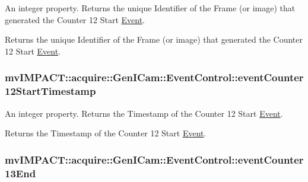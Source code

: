 An integer property. Returns the unique Identifier of the Frame (or image) that generated the Counter 12 Start \hyperlink{classmv_i_m_p_a_c_t_1_1acquire_1_1_event}{Event}. 

Returns the unique Identifier of the Frame (or image) that generated the Counter 12 Start \hyperlink{classmv_i_m_p_a_c_t_1_1acquire_1_1_event}{Event}. \hypertarget{classmv_i_m_p_a_c_t_1_1acquire_1_1_gen_i_cam_1_1_event_control_a2853dbaf1b04cce3c42101bddce4fa06}{
\subsubsection[{event\+Counter12\+Start\+Timestamp}]{ mv\+I\+M\+P\+A\+C\+T\+::acquire\+::\+Gen\+I\+Cam\+::\+Event\+Control\+::event\+Counter12\+Start\+Timestamp}}\label{classmv_i_m_p_a_c_t_1_1acquire_1_1_gen_i_cam_1_1_event_control_a2853dbaf1b04cce3c42101bddce4fa06}


An integer property. Returns the Timestamp of the Counter 12 Start \hyperlink{classmv_i_m_p_a_c_t_1_1acquire_1_1_event}{Event}. 

Returns the Timestamp of the Counter 12 Start \hyperlink{classmv_i_m_p_a_c_t_1_1acquire_1_1_event}{Event}. \hypertarget{classmv_i_m_p_a_c_t_1_1acquire_1_1_gen_i_cam_1_1_event_control_a2185b2529e146ab7edc841afb39b63e3}{
\subsubsection[{event\+Counter13\+End}]{ mv\+I\+M\+P\+A\+C\+T\+::acquire\+::\+Gen\+I\+Cam\+::\+Event\+Control\+::event\+Counter13\+End}}\label{classmv_i_m_p_a_c_t_1_1acquire_1_1_gen_i_cam_1_1_event_control_a2185b2529e146ab7edc841afb39b63e3}



